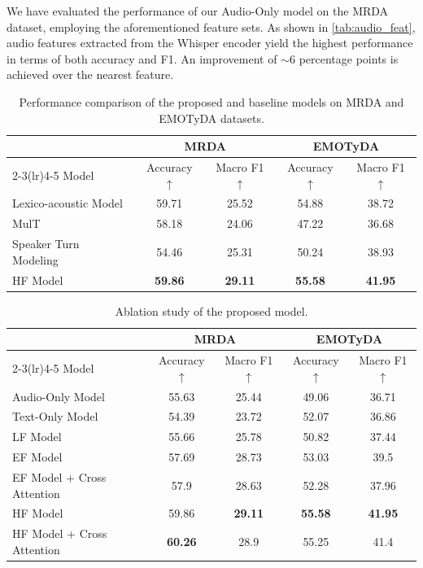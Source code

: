 We have evaluated the performance of our Audio-Only model on the MRDA dataset, employing the aforementioned feature sets. 
As shown in \autoref{tab:audio_feat}, audio features extracted from the Whisper encoder yield the highest performance in terms of both accuracy and F1. An improvement of $\sim$6 percentage points is achieved over the nearest feature.
%


\begin{table}[h]
\centering
\small
\begin{tabular}{lcccc}
\toprule
~ & \multicolumn{2}{c}{MRDA} & \multicolumn{2}{c}{EMOTyDA} \\
\cmidrule(lr){2-3}\cmidrule(lr){4-5}
Model & Accuracy$\uparrow$ & Macro F1$\uparrow$ & Accuracy$\uparrow$ & Macro F1$\uparrow$ \\
\midrule
Lexico-acoustic Model \cite{lexico} & 59.71 & 25.52 & 54.88 & 38.72 \\
MulT \cite{tsai-etal-2019-multimodal} & 58.18 & 24.06 & 47.22 & 36.68 \\
Speaker Turn Modeling \cite{he-etal-2021-speaker-turn} & 54.46 & 25.31 & 50.24 & 38.93 \\
\midrule
HF Model & \textbf{59.86} & \textbf{29.11} & \textbf{55.58} & \textbf{41.95} \\
\bottomrule
\end{tabular}
\caption{Performance comparison of the proposed and baseline models on MRDA and EMOTyDA datasets.}
\label{tab:comparison}
\end{table}

\begin{table}[h]
\centering
\small
\begin{tabular}{lcccc}
\toprule
~ & \multicolumn{2}{c}{MRDA} & \multicolumn{2}{c}{EMOTyDA} \\
\cmidrule(lr){2-3}\cmidrule(lr){4-5}
Model & Accuracy$\uparrow$ & Macro F1$\uparrow$ & Accuracy$\uparrow$ & Macro F1$\uparrow$ \\
\midrule
Audio-Only Model & 55.63 & 25.44 & 49.06 & 36.71 \\
Text-Only Model & 54.39 & 23.72 & 52.07 & 36.86 \\
\midrule
LF Model & 55.66 & 25.78 & 50.82 & 37.44 \\
\midrule
EF Model & 57.69 & 28.73 & 53.03 & 39.5 \\
EF Model + Cross Attention & 57.9 & 28.63 & 52.28 & 37.96 \\
\midrule
HF Model & 59.86 & \textbf{29.11} & \textbf{55.58} & \textbf{41.95} \\
HF Model + Cross Attention & \textbf{60.26} & 28.9 & 55.25 & 41.4 \\
\bottomrule
\end{tabular}
\caption{Ablation study of the proposed model.}
\label{tab:ablation}
\end{table}


